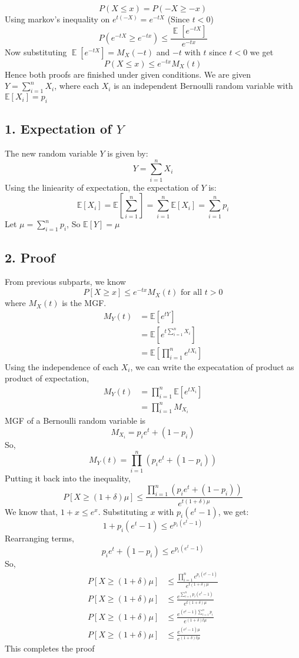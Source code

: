 \begin{solution}
\begin{equation}
     P(X \leq x) = P(-X\geq -x)
 \end{equation}
 Using markov's inequality on $e^{t(-X)}=e^{-tX}$ (Since $t<0$) 
 \begin{equation}
     P(e^{-tX}\geq e^{-tx})\leq \frac{\mathop{\mathbb{E}}[e^{-tX}]}{e^{-tx}}
 \end{equation}
 Now substituting $\mathop{\mathbb{E}}[e^{-tX}]=M_{X}(-t)$ and $- t$ with $t$ since $t<0$ we get 
 \begin{equation}
     P(X\leq x)\leq e^{-tx}M_{X}(t)
 \end{equation}
 Hence both proofs are finished under given conditions.
	We are given $Y = \sum^n_{i=1}X_i$, where each $X_i$ is an independent Bernoulli random variable with $\mathds{E}[X_i] = p_i$ 
	\subsection*{1. Expectation of $Y$}
	The new random variable $Y$ is given by:
	\[Y = \sum^n_{i=1}X_i\]
	Using the liniearity of expectation, the expectation of $Y$ is:
	\[\mathds{E}[X_i] = \mathds{E}\left[\sum_{i=1}^{n}\right] = \sum_{i=1}^{n}\mathds{E}[X_i] = \sum_{i=1}^{n}p_i\]
	Let $\mu = \sum_{i=1}^{n}p_i$, So $\mathds{E}[Y]=\mu$
	\subsection*{2. Proof}
	From previous subparts, we know
	\[P[X\geq x]\leq e^{-tx}M_X(t) \text{ for all } t>0\]
	where $M_X(t)$ is the MGF.
	\begin{align}
		M_Y(t) & = \mathds{E}[e^{tY}]\\
		& = \mathds{E}[e^{t\sum_{i=1}^{n}X_i}]\\
		& = \mathds{E}\left[\prod_{i=1}^{n}e^{tX_i}\right]
	\end{align}
	Using the independence of each $X_i$, we can write the expecatation of product as product of expectation,
	\begin{align}
		M_Y(t) & = \prod_{i=1}^{n}\mathds{E}[e^{tX_i}]\\
		& = \prod_{i=1}^{n}M_{X_i}
	\end{align}
	MGF of a Bernoulli random variable is 
	\[M_{X_i} = p_ie^t+(1-p_i)\]
	So,
	\[
		M_Y(t) = \prod_{i=1}^{n}(p_ie^t+(1-p_i))
	\]
	Putting it back into the inequality,
	\[P[X\geq (1+\delta)\mu]\leq \frac{\prod_{i=1}^{n}(p_ie^t+(1-p_i))}{e^{t(1+\delta)\mu}}\]
	We know that, $1+x \leq e^x$. Substituting $x$ with $p_i(e^t-1)$, we get:
	\[1+p_i(e^t-1) \leq e^{p_i(e^t-1)}\]
	Rearranging terms,
	\[p_ie^t + (1-p_i) \leq e^{p_i(e^t-1)} \]
	So,
	\begin{align}
		P[X\geq (1+\delta)\mu] & \leq \frac{\prod_{i=1}^{n}e^{p_i(e^t-1)}}{e^{t(1+\delta)\mu}} \\
		P[X\geq (1+\delta)\mu] & \leq \frac{e^{\sum_{i=1}^{n}p_i(e^t-1)}}{e^{t(1+\delta)\mu}}\\
		P[X\geq (1+\delta)\mu] & \leq \frac{e^{(e^t-1)\sum_{i=1}^{n}p_i}}{e^{(1+\delta)t\mu}}\\
		P[X\geq (1+\delta)\mu] & \leq \frac{e^{(e^t-1)\mu}}{e^{(1+\delta)t\mu}}
	\end{align}
	This completes the proof
\end{solution}
